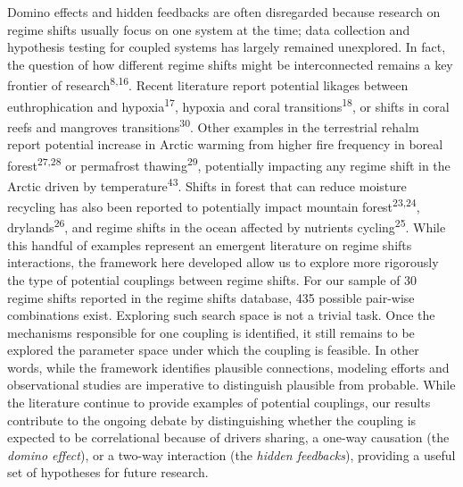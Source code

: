 \documentclass[9pt,]{article}
\begin{document}
Domino effects and hidden feedbacks are often disregarded because
research on regime shifts usually focus on one system at the time; data
collection and hypothesis testing for coupled systems has largely
remained unexplored. In fact, the question of how different regime
shifts might be interconnected remains a key frontier of
research\textsuperscript{8,16}. Recent literature report potential
likages between euthrophication and hypoxia\textsuperscript{17}, hypoxia
and coral transitions\textsuperscript{18}, or shifts in coral reefs and
mangroves transitions\textsuperscript{30}. Other examples in the
terrestrial rehalm report potential increase in Arctic warming from
higher fire frequency in boreal forest\textsuperscript{27,28} or
permafrost thawing\textsuperscript{29}, potentially impacting any regime
shift in the Arctic driven by temperature\textsuperscript{43}. Shifts in
forest that can reduce moisture recycling has also been reported to
potentially impact mountain forest\textsuperscript{23,24},
drylands\textsuperscript{26}, and regime shifts in the ocean affected by
nutrients cycling\textsuperscript{25}. While this handful of examples
represent an emergent literature on regime shifts interactions, the
framework here developed allow us to explore more rigorously the type of
potential couplings between regime shifts. For our sample of 30 regime
shifts reported in the regime shifts database, 435 possible pair-wise
combinations exist. Exploring such search space is not a trivial task.
Once the mechanisms responsible for one coupling is identified, it still
remains to be explored the parameter space under which the coupling is
feasible. In other words, while the framework identifies plausible
connections, modeling efforts and observational studies are imperative
to distinguish plausible from probable. While the literature continue to
provide examples of potential couplings, our results contribute to the
ongoing debate by distinguishing whether the coupling is expected to be
correlational because of drivers sharing, a one-way causation (the
\emph{domino effect}), or a two-way interaction (the \emph{hidden
feedbacks}), providing a useful set of hypotheses for future research.
\end{document}

